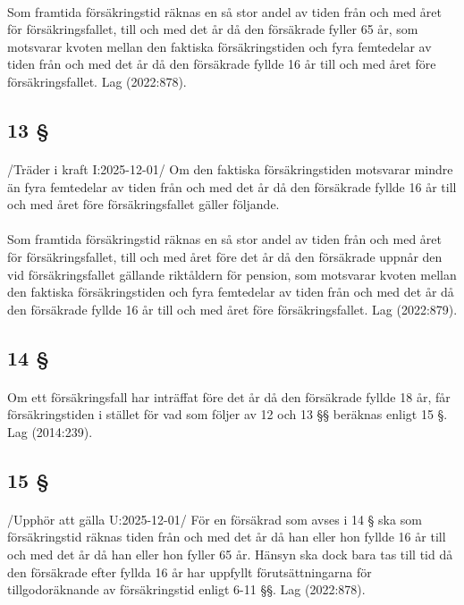 \documentclass[a4paper,notitlepage,openany,10pt]{book}
\begin{document}
\paragraph*{}
Som framtida försäkringstid räknas en så stor andel av tiden från och med året för försäkringsfallet, till och med det år då den försäkrade fyller 65 år, som motsvarar kvoten mellan den faktiska försäkringstiden och fyra femtedelar av tiden från och med det år då den försäkrade fyllde 16 år till och med året före försäkringsfallet.
Lag (2022:878).
\subsection*{13 §}
\paragraph*{}
/Träder i kraft I:2025-12-01/
Om den faktiska försäkringstiden motsvarar mindre än fyra femtedelar av tiden från och med det år då den försäkrade fyllde 16 år till och med året före försäkringsfallet gäller följande.
\paragraph*{}
Som framtida försäkringstid räknas en så stor andel av tiden från och med året för försäkringsfallet, till och med året före det år då den försäkrade uppnår den vid försäkringsfallet gällande riktåldern för pension, som motsvarar kvoten mellan den faktiska försäkringstiden och fyra femtedelar av tiden från och med det år då den försäkrade fyllde 16 år till och med året före försäkringsfallet.
Lag (2022:879).
\subsection*{14 §}
\paragraph*{}
Om ett försäkringsfall har inträffat före det år då den försäkrade fyllde 18 år, får försäkringstiden i stället för vad som följer av 12 och 13 §§ beräknas enligt 15 §.
Lag (2014:239).
\subsection*{15 §}
\paragraph*{}
/Upphör att gälla U:2025-12-01/
För en försäkrad som avses i 14 § ska som försäkringstid räknas tiden från och med det år då han eller hon fyllde 16 år till och med det år då han eller hon fyller 65 år. Hänsyn ska dock bara tas till tid då den försäkrade efter fyllda 16 år har uppfyllt förutsättningarna för tillgodoräknande av försäkringstid enligt 6-11 §§.
Lag (2022:878).
\end{document}
